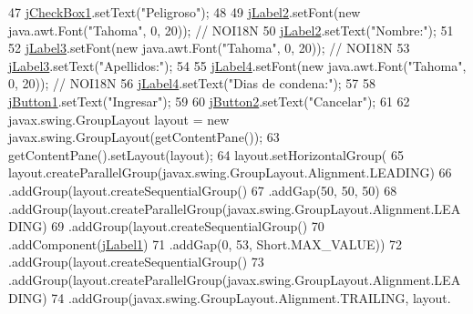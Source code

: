 \begin{DoxyCode}
47         \mbox{\hyperlink{classsoftware_1_1_ingresar_preso_af5dd1d64cebd5001a66aa292c76e6238}{jCheckBox1}}.setText(\textcolor{stringliteral}{"Peligroso"});
48 
49         \mbox{\hyperlink{classsoftware_1_1_ingresar_preso_abdc8c3f8f7c224e30ff7c4b6c96d5f3f}{jLabel2}}.setFont(\textcolor{keyword}{new} java.awt.Font(\textcolor{stringliteral}{"Tahoma"}, 0, 20)); \textcolor{comment}{// NOI18N}
50         \mbox{\hyperlink{classsoftware_1_1_ingresar_preso_abdc8c3f8f7c224e30ff7c4b6c96d5f3f}{jLabel2}}.setText(\textcolor{stringliteral}{"Nombre:"});
51 
52         \mbox{\hyperlink{classsoftware_1_1_ingresar_preso_a83ed6c4480193eb6924a625e224524fd}{jLabel3}}.setFont(\textcolor{keyword}{new} java.awt.Font(\textcolor{stringliteral}{"Tahoma"}, 0, 20)); \textcolor{comment}{// NOI18N}
53         \mbox{\hyperlink{classsoftware_1_1_ingresar_preso_a83ed6c4480193eb6924a625e224524fd}{jLabel3}}.setText(\textcolor{stringliteral}{"Apellidos:"});
54 
55         \mbox{\hyperlink{classsoftware_1_1_ingresar_preso_a5fb6376942dfd9a5ed07eb887918bea7}{jLabel4}}.setFont(\textcolor{keyword}{new} java.awt.Font(\textcolor{stringliteral}{"Tahoma"}, 0, 20)); \textcolor{comment}{// NOI18N}
56         \mbox{\hyperlink{classsoftware_1_1_ingresar_preso_a5fb6376942dfd9a5ed07eb887918bea7}{jLabel4}}.setText(\textcolor{stringliteral}{"Dias de condena:"});
57 
58         \mbox{\hyperlink{classsoftware_1_1_ingresar_preso_a6c00105c7f9dbaf091e58501f2f32fb9}{jButton1}}.setText(\textcolor{stringliteral}{"Ingresar"});
59 
60         \mbox{\hyperlink{classsoftware_1_1_ingresar_preso_a33ce6c95d87a5c987b9efde232b63e10}{jButton2}}.setText(\textcolor{stringliteral}{"Cancelar"});
61 
62         javax.swing.GroupLayout layout = \textcolor{keyword}{new} javax.swing.GroupLayout(getContentPane());
63         getContentPane().setLayout(layout);
64         layout.setHorizontalGroup(
65             layout.createParallelGroup(javax.swing.GroupLayout.Alignment.LEADING)
66             .addGroup(layout.createSequentialGroup()
67                 .addGap(50, 50, 50)
68                 .addGroup(layout.createParallelGroup(javax.swing.GroupLayout.Alignment.LEADING)
69                     .addGroup(layout.createSequentialGroup()
70                         .addComponent(\mbox{\hyperlink{classsoftware_1_1_ingresar_preso_a2636febe75f015393218663a91a34e0d}{jLabel1}})
71                         .addGap(0, 53, Short.MAX\_VALUE))
72                     .addGroup(layout.createSequentialGroup()
73                         .addGroup(layout.createParallelGroup(javax.swing.GroupLayout.Alignment.LEADING)
74                             .addGroup(javax.swing.GroupLayout.Alignment.TRAILING, layout.

\end{DoxyCode}
